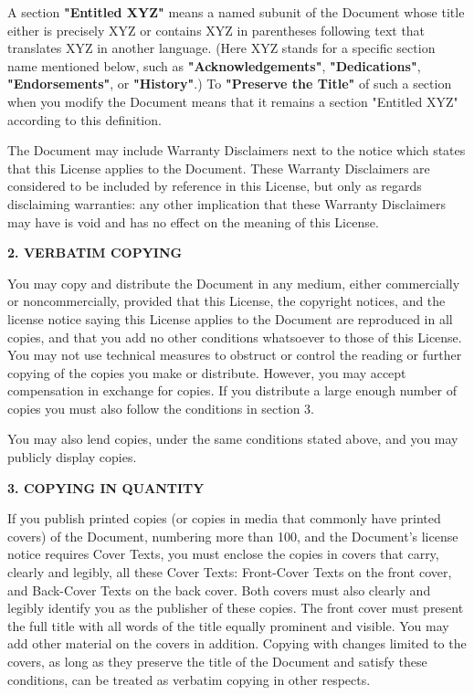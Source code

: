 \documentclass[11pt]{book}
\begin{document}
A section \textbf{"Entitled XYZ"} means a named subunit of the Document whose
title either is precisely XYZ or contains XYZ in parentheses following
text that translates XYZ in another language.  (Here XYZ stands for a
specific section name mentioned below, such as \textbf{"Acknowledgements"},
\textbf{"Dedications"}, \textbf{"Endorsements"}, or \textbf{"History"}.)  
To \textbf{"Preserve the Title"}
of such a section when you modify the Document means that it remains a
section "Entitled XYZ" according to this definition.

The Document may include Warranty Disclaimers next to the notice which
states that this License applies to the Document.  These Warranty
Disclaimers are considered to be included by reference in this
License, but only as regards disclaiming warranties: any other
implication that these Warranty Disclaimers may have is void and has
no effect on the meaning of this License.


\begin{center}
{\Large\bf 2. VERBATIM COPYING}
\end{center}

You may copy and distribute the Document in any medium, either
commercially or noncommercially, provided that this License, the
copyright notices, and the license notice saying this License applies
to the Document are reproduced in all copies, and that you add no other
conditions whatsoever to those of this License.  You may not use
technical measures to obstruct or control the reading or further
copying of the copies you make or distribute.  However, you may accept
compensation in exchange for copies.  If you distribute a large enough
number of copies you must also follow the conditions in section 3.

You may also lend copies, under the same conditions stated above, and
you may publicly display copies.


\begin{center}
{\Large\bf 3. COPYING IN QUANTITY}
\end{center}


If you publish printed copies (or copies in media that commonly have
printed covers) of the Document, numbering more than 100, and the
Document's license notice requires Cover Texts, you must enclose the
copies in covers that carry, clearly and legibly, all these Cover
Texts: Front-Cover Texts on the front cover, and Back-Cover Texts on
the back cover.  Both covers must also clearly and legibly identify
you as the publisher of these copies.  The front cover must present
the full title with all words of the title equally prominent and
visible.  You may add other material on the covers in addition.
Copying with changes limited to the covers, as long as they preserve
the title of the Document and satisfy these conditions, can be treated
as verbatim copying in other respects.
\end{document}
